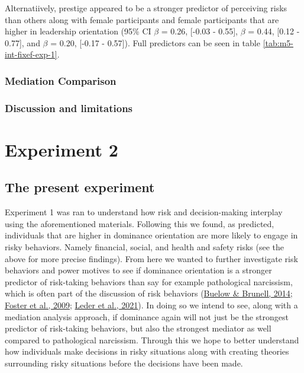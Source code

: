 \documentclass[
  donotrepeattitle,doc, 12pt, a4paper,floatsintext]{apa7}
\begin{document}
Alternatiively, prestige appeared to be a stronger predictor of perceiving risks than others along with female participants and female participants that are higher in leadership orientation (95\% CI \(\beta\) = 0.26, {[}-0.03 - 0.55{]}, \(\beta\) = 0.44, {[}0.12 - 0.77{]}, and \(\beta\) = 0.20, {[}-0.17 - 0.57{]}). Full predictors can be seen in table \ref{tab:m5-int-fixef-exp-1}.

\hypertarget{mediation-comparison}{%
\subsubsection{Mediation Comparison}\label{mediation-comparison}}

\hypertarget{discussion-and-limitations}{%
\subsubsection{Discussion and limitations}\label{discussion-and-limitations}}

\newpage

\hypertarget{experiment-2}{%
\section{Experiment 2}\label{experiment-2}}

\hypertarget{the-present-experiment}{%
\subsection{The present experiment}\label{the-present-experiment}}

Experiment 1 was ran to understand how risk and decision-making interplay using the aforementioned materials. Following this we found, as predicted, individuals that are higher in dominance orientation are more likely to engage in risky behaviors. Namely financial, social, and health and safety risks (see the above for more precise findings). From here we wanted to further investigate risk behaviors and power motives to see if dominance orientation is a stronger predictor of risk-taking behaviors than say for example pathological narcissism, which is often part of the discussion of risk behaviors (\protect\hyperlink{ref-buelow2014}{Buelow \& Brunell, 2014}; \protect\hyperlink{ref-foster2009}{Foster et al., 2009}; \protect\hyperlink{ref-leder2021}{Leder et al., 2021}). In doing so we intend to see, along with a mediation analysis approach, if dominance again will not just be the strongest predictor of risk-taking behaviors, but also the strongest mediator as well compared to pathological narcissism. Through this we hope to better understand how individuals make decisions in risky situations along with creating theories surrounding risky situations before the decisions have been made.
\end{document}
